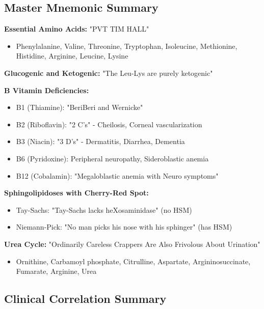 \subsection{Master Mnemonic Summary}

\begin{tcolorbox}[colback=green!5, colframe=green!70!black, title=\textbf{Essential Mnemonics for Board Exams}]

\textbf{Essential Amino Acids:} "PVT TIM HALL"
\begin{itemize}
    \item Phenylalanine, Valine, Threonine, Tryptophan, Isoleucine, Methionine, Histidine, Arginine, Leucine, Lysine
\end{itemize}

\textbf{Glucogenic and Ketogenic:} "The Leu-Lys are purely ketogenic"

\textbf{B Vitamin Deficiencies:}
\begin{itemize}
    \item B1 (Thiamine): "BeriBeri and Wernicke"
    \item B2 (Riboflavin): "2 C's" - Cheilosis, Corneal vascularization
    \item B3 (Niacin): "3 D's" - Dermatitis, Diarrhea, Dementia
    \item B6 (Pyridoxine): Peripheral neuropathy, Sideroblastic anemia
    \item B12 (Cobalamin): "Megaloblastic anemia with Neuro symptoms"
\end{itemize}

\textbf{Sphingolipidoses with Cherry-Red Spot:}
\begin{itemize}
    \item Tay-Sachs: "Tay-Sachs lacks heXosaminidase" (no HSM)
    \item Niemann-Pick: "No man picks his nose with his sphinger" (has HSM)
\end{itemize}

\textbf{Urea Cycle:} "Ordinarily Careless Crappers Are Also Frivolous About Urination"
\begin{itemize}
    \item Ornithine, Carbamoyl phosphate, Citrulline, Aspartate, Argininosuccinate, Fumarate, Arginine, Urea
\end{itemize}

\end{tcolorbox}

\subsection{Clinical Correlation Summary}

